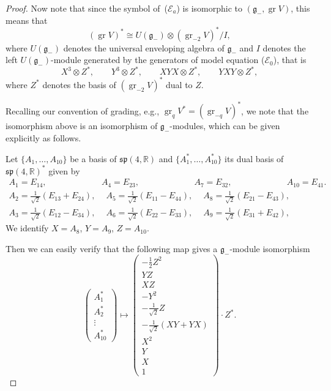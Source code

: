 \documentclass[10pt,a4paper]{amsart}
\newcommand{\R}{\mathbb R}
\newcommand{\E}{\mathcal E}
\newcommand{\g}{\mathfrak g}
\newcommand{\fsp}{\mathfrak{sp}}
\newcommand{\gr}{\operatorname{gr}}
\numberwithin{equation}{section}
\begin{document}
\begin{proof}
	Now note that since the symbol of~($\E_a$) is isomorphic to $(\g_{-}, \gr V)$, this means that
	\[
		(\gr V)^* \cong U(\g_{-})\otimes (\gr_{-2} V)^*/I,
	\]
	where $U(\g_{-})$ denotes the universal enveloping algebra of $\g_{-}$ and $I$ denotes the left $U(\g_{-})$-module generated by the generators of model equation ($\E_0$), that is
	\[
		X^3\otimes Z^*,\qquad Y^3\otimes Z^*,\qquad XYX\otimes Z^*,\qquad YXY\otimes Z^*,
	\]
	where $Z^*$ denotes the basis of $(\gr_{-2} V)^*$ dual to $Z$.
	
	Recalling our convention of grading, e.g., $\gr_q V^*=(\gr_{-q} V)^*$, we note that the isomorphism above is an isomorphism of $\g_{-}$-modules, which can be given explicitly as follows.
	
	Let $\{A_1,\dots, A_{10}\}$ be a basis of $\fsp(4,\R)$ and $\{A_1^*,\dots,A_{10}^*\}$ its dual basis of $\fsp(4,\R)^*$ given by	
\begin{gather*}
A_1 = E_{14},\ \quad\qquad\qquad\quad\, A_4 =E_{23},\ \quad\qquad\qquad\quad\,
A_7 =E_{32} ,\ \quad\qquad\qquad\quad\, A_{10} = E_{41}.
\\
A_2 = \frac{1}{\sqrt{2}}(E_{13}+E_{24}),\quad \ A_5 =\frac{1}{\sqrt{2}}(E_{11}-E_{44}),\quad \
A_8 = \frac{1}{\sqrt{2}}(E_{21}-E_{43}) ,
\\
A_3 = \frac{1}{\sqrt{2}}(E_{12}-E_{34}),\quad\ A_6 = \frac{1}{\sqrt{2}}(E_{22}-E_{33}), \quad \
A_9 = \frac{1}{\sqrt{2}}(E_{31}+E_{42}),
\end{gather*}
	We identify $X=A_8$, $Y=A_9$, $Z=A_{10}$.
	
	Then we can easily verify that the following map gives a $\g_{-}$-module isomorphism
	\[
		\begin{pmatrix} A_1^* \\ A_2^* \\ \vdots \\ A_{10}^*
		\end{pmatrix}
		\mapsto
	 \begin{pmatrix}
		-\frac{1}{2}Z^2 \\
		YZ \\
		XZ \\
		-Y^2 \\
		-\frac{1}{\sqrt{2}}Z\\
		-\frac{1}{\sqrt{2}}(XY+YX)\\
		X^2\\
		Y \\
		X\\
		1
		\end{pmatrix} \cdot Z^* .
	\]
	

\end{proof}
\end{document}
